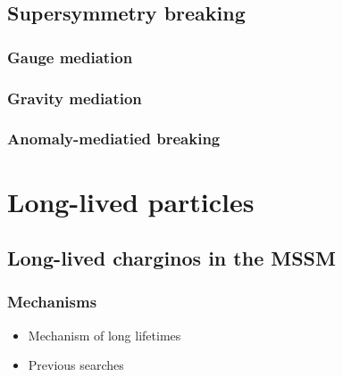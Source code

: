 \section{Supersymmetry breaking}
\subsection{Gauge mediation}
\subsection{Gravity mediation}
\subsection{Anomaly-mediatied breaking}

\chapter{Long-lived particles}

\section{Long-lived charginos in the MSSM}
\subsection{Mechanisms}
\begin{itemize}
\item Mechanism of long lifetimes
\item Previous searches
\end{itemize}
